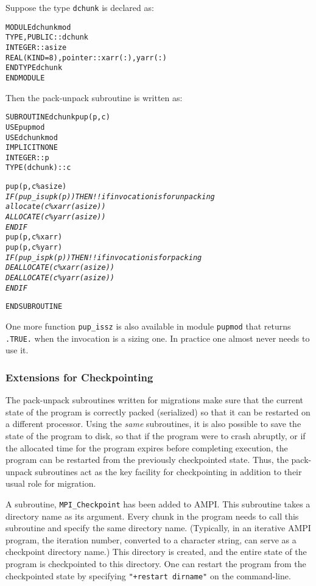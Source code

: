 \documentclass[10pt]{article}
\begin{document}
Suppose the type \texttt{dchunk} is declared as:

\begin{alltt}
MODULE dchunkmod
  TYPE, PUBLIC :: dchunk
      INTEGER :: asize
      REAL(KIND=8), pointer :: xarr(:), yarr(:)
  END TYPE dchunk
END MODULE
\end{alltt}

Then the pack-unpack subroutine is written as:

\begin{alltt}
SUBROUTINE dchunkpup(p, c)
  USE pupmod
  USE dchunkmod
  IMPLICIT NONE
  INTEGER :: p
  TYPE(dchunk) :: c

  pup(p, c\%asize)
  \emph{
  IF (pup_isupk(p)) THEN       !! if invocation is for unpacking
    allocate(c\%xarr(asize))
    ALLOCATE(c\%yarr(asize))
  ENDIF
  }
  pup(p, c\%xarr)
  pup(p, c\%yarr)
  \emph{
  IF (pup_ispk(p)) THEN        !! if invocation is for packing
    DEALLOCATE(c\%xarr(asize))
    DEALLOCATE(c\%yarr(asize))
  ENDIF
  }

END SUBROUTINE
\end{alltt}

One more function \verb+pup_issz+ is also available in module \texttt{pupmod}
that returns \verb+.TRUE.+ when the invocation is a sizing one. In practice one
almost never needs to use it.

\subsubsection{Extensions for Checkpointing}

The pack-unpack subroutines written for migrations make sure that the current
state of the program is correctly packed (serialized) so that it can be
restarted on a different processor. Using the \emph{same} subroutines, it
is also possible to save the state of the program to disk, so that if the 
program were to crash abruptly, or if the allocated time for the program
expires before completing execution, the program can be restarted from the
previously checkpointed state. Thus, the pack-unpack subroutines act as the key facility for checkpointing in addition to their usual role for migration.

A subroutine, \texttt{MPI\_Checkpoint} has been added to AMPI. This subroutine
takes a directory name as its argument. Every chunk in the program needs to
call this subroutine and specify the same directory name. (Typically, in an
iterative AMPI program, the iteration number, converted to a character string,
can serve as a checkpoint directory name.) This directory is created, and the
entire state of the program is checkpointed to this directory.  One can restart
the program from the checkpointed state by specifying \texttt{"+restart
dirname"} on the command-line.
\end{document}
